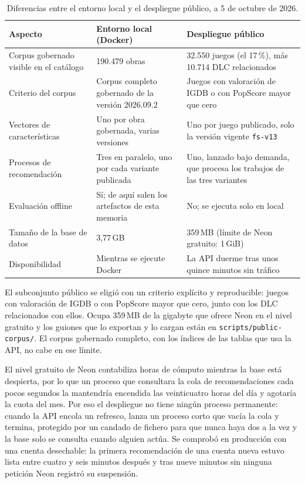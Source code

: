\begin{table}[H]
\centering
\begin{tabularx}{\textwidth}{ | L{0.26\textwidth} | Y | Y | }
    \hline
    \textbf{Aspecto} & \textbf{Entorno local (Docker)} & \textbf{Despliegue público} \\
    \hline
    Corpus gobernado visible en el catálogo & 190.479 obras & 32.550 juegos (el 17\,\%), más 10.714 DLC relacionados \\
    \hline
    Criterio del corpus & Corpus completo gobernado de la versión 2026.09.2 & Juegos con valoración de IGDB o con PopScore mayor que cero \\
    \hline
    Vectores de características & Uno por obra gobernada, varias versiones & Uno por juego publicado, solo la versión vigente \texttt{fs-v13} \\
    \hline
    Procesos de recomendación & Tres en paralelo, uno por cada variante publicada & Uno, lanzado bajo demanda, que procesa los trabajos de las tres variantes \\
    \hline
    Evaluación offline & Sí; de aquí salen los artefactos de esta memoria & No; se ejecuta solo en local \\
    \hline
    Tamaño de la base de datos & 3,77\,GB & 359\,MB (límite de Neon gratuito: 1\,GiB) \\
    \hline
    Disponibilidad & Mientras se ejecute Docker & La API duerme tras unos quince minutos sin tráfico \\
    \hline
\end{tabularx}
\caption{Diferencias entre el entorno local y el despliegue público, a 5 de octubre de 2026.}
\label{tab:local-publico}
\end{table}

El subconjunto público se eligió con un criterio explícito y reproducible: juegos con valoración de IGDB o con PopScore
mayor que cero, junto con los DLC relacionados con ellos. Ocupa 359\,MB de la gigabyte que ofrece Neon en el nivel
gratuito y los guiones que lo exportan y lo cargan están en \texttt{scripts/public-corpus/}. El corpus gobernado completo,
con los índices de las tablas que usa la API, no cabe en ese límite.

El nivel gratuito de Neon contabiliza horas de cómputo mientras la base está despierta, por lo que un proceso que
consultara la cola de recomendaciones cada pocos segundos la mantendría encendida las veinticuatro horas del día y
agotaría la cuota del mes. Por eso el despliegue no tiene ningún proceso permanente: cuando la API encola un refresco,
lanza un proceso corto que vacía la cola y termina, protegido por un candado de fichero para que nunca haya dos a la vez
y la base solo se consulta cuando alguien actúa. Se comprobó en producción con una cuenta desechable: la primera
recomendación de una cuenta nueva estuvo lista entre cuatro y seis minutos después y tras nueve minutos sin ninguna
petición Neon registró su suspensión.

